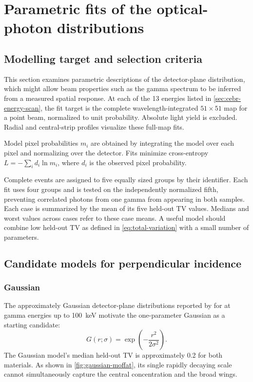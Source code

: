 \section{Parametric fits of the optical-photon distributions}
\label{sec:fits}

\subsection{Modelling target and selection criteria}
\label{sec:shape-validation}

This section examines parametric descriptions of the detector-plane distribution, which might allow beam properties such as the gamma spectrum to be inferred from a measured spatial response. At each of the 13 energies listed in \cref{sec:cebr-energy-scan}, the fit target is the complete wavelength-integrated $51\times51$ map for a point beam, normalized to unit probability. Absolute light yield is excluded. Radial and central-strip profiles visualize these full-map fits.

Model pixel probabilities $m_i$ are obtained by integrating the model over each pixel and normalizing over the detector. Fits minimize cross-entropy $L=-\sum_i d_i\ln m_i$, where $d_i$ is the observed pixel probability.

Complete events are assigned to five equally sized groups by their identifier. Each fit uses four groups and is tested on the independently normalized fifth, preventing correlated photons from one gamma from appearing in both samples. Each case is summarized by the mean of its five held-out TV values. Medians and worst values across cases refer to these case means. A useful model should combine low held-out TV as defined in \cref{eq:total-variation} with a small number of parameters.

\subsection{Candidate models for perpendicular incidence}

\subsubsection{Gaussian}
The approximately Gaussian detector-plane distributions reported by \textcite[p.~40]{ovsiannikova2020light} for  at gamma energies up to \qty{100}{\kilo\electronvolt} motivate the one-parameter Gaussian as a starting candidate:
\begin{equation}
  G(r;\sigma)=\exp\!\left(-\frac{r^2}{2\sigma^2}\right).
\end{equation}
The Gaussian model's median held-out TV is approximately 0.2 for both materials. As shown in \cref{fig:gaussian-moffat}, its single rapidly decaying scale cannot simultaneously capture the central concentration and the broad wings.

